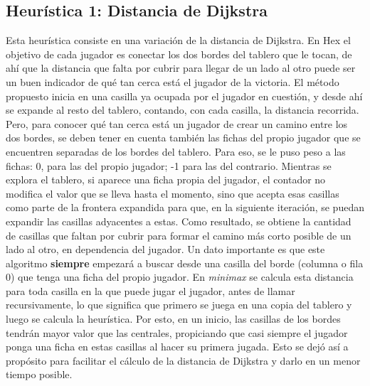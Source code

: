 \documentclass[spanish]{article}
\begin{document}
\subsection{Heur\'istica 1: Distancia de Dijkstra}
Esta heurística consiste en una variación de la distancia de Dijkstra. En Hex el objetivo de cada jugador es conectar los dos bordes del tablero que le tocan, de ah\'i que la distancia que falta por cubrir para llegar de un lado al otro puede ser un buen indicador de qu\'e tan cerca est\'a el jugador de la victoria.
El m\'etodo propuesto inicia en una casilla ya ocupada por el jugador en cuesti\'on, y desde ah\'i se expande al resto del tablero, contando, con cada casilla, la distancia recorrida.
Pero, para conocer qu\'e tan cerca est\'a un jugador de crear un camino entre los dos bordes, se deben tener en cuenta tambi\'en las fichas del propio jugador que se encuentren separadas de los bordes del tablero. Para eso, se le puso peso a las fichas: 0, para las del propio jugador; -1 para las del contrario. Mientras se explora el tablero, si aparece una ficha propia del jugador, el contador no modifica el valor que se lleva hasta el momento, sino que acepta esas casillas como parte de la frontera expandida para que, en la siguiente iteraci\'on, se puedan expandir las casillas adyacentes a estas. Como resultado, se obtiene la cantidad de casillas que faltan por cubrir para formar el camino m\'as corto posible de un lado al otro, en dependencia del jugador.
Un dato importante es que este algoritmo \textbf{siempre} empezar\'a a buscar desde una casilla del borde (columna o fila 0) que tenga una ficha del propio jugador. En \textit{minimax} se calcula esta distancia para toda casilla en la que puede jugar el jugador, antes de llamar recursivamente, lo que significa que primero se juega en una copia del tablero y luego se calcula la heur\'istica. Por esto, en un inicio, las casillas de los bordes tendr\'an mayor valor que las centrales, propiciando que casi siempre el jugador ponga una ficha en estas casillas al hacer su primera jugada. Esto se dej\'o as\'i a prop\'osito para facilitar el c\'alculo de la distancia de Dijkstra y darlo en un menor tiempo posible. \\
\end{document}
